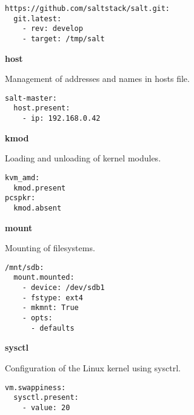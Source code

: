 \documentclass[landscape,a4paper,10pt]{article}
\begin{document}
\begin{multicols}{3}
\begin{verbatim}
https://github.com/saltstack/salt.git:
  git.latest:
    - rev: develop
    - target: /tmp/salt
\end{verbatim}

\bfseries{\LARGE{host}}

Management of addresses and names in hosts file.

\begin{verbatim}
salt-master:
  host.present:
    - ip: 192.168.0.42
\end{verbatim}

\bfseries{\LARGE{kmod}}

Loading and unloading of kernel modules.

\begin{verbatim}
kvm_amd:
  kmod.present
pcspkr:
  kmod.absent
\end{verbatim}

\bfseries{\LARGE{mount}}

Mounting of filesystems.

\begin{verbatim}
/mnt/sdb:
  mount.mounted:
    - device: /dev/sdb1
    - fstype: ext4
    - mkmnt: True
    - opts:
      - defaults
\end{verbatim}

\bfseries{\LARGE{sysctl}}

Configuration of the Linux kernel using sysctrl.

\begin{verbatim}
vm.swappiness:
  sysctl.present:
    - value: 20
\end{verbatim}

\end{multicols}
\end{document}
